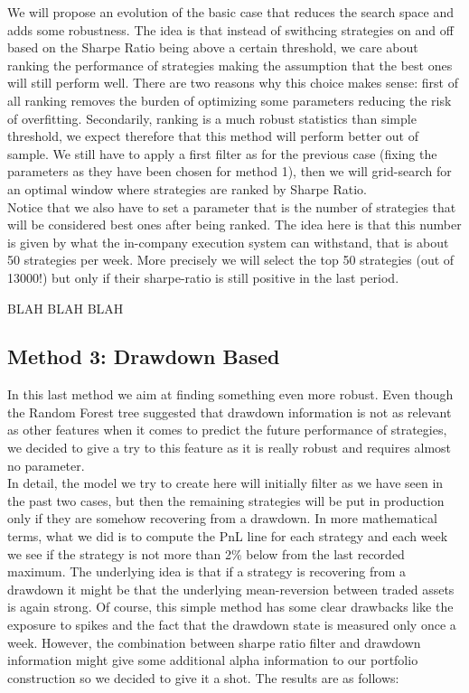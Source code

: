 \documentclass[a4paper]{article}
\numberwithin{equation}{subsection}
\begin{document}
We will propose an evolution of the basic case that reduces the search space and adds some robustness. The idea is that instead of swithcing strategies on and off based on the Sharpe Ratio being above a certain threshold, we care about ranking the performance of strategies making the assumption that the best ones will still perform well. There are two reasons why this choice makes sense: first of all ranking removes the burden of optimizing some parameters reducing the risk of overfitting. Secondarily, ranking is a much robust statistics than simple threshold, we expect therefore that this method will perform better out of sample. We still have to apply a first filter as for the previous case (fixing the parameters as they have been chosen for method 1), then we will grid-search for an optimal window where strategies are ranked by Sharpe Ratio.\\
Notice that we also have to set a parameter that is the number of strategies that will be considered best ones after being ranked. The idea here is that this number is given by what the in-company execution system can withstand, that is about 50 strategies per week. More precisely we will select the top 50 strategies (out of 13000!) but only if their sharpe-ratio is still positive in the last period.


BLAH BLAH BLAH\\


\subsection*{Method 3: Drawdown Based}

In this last method we aim at finding something even more robust. Even though the Random Forest tree suggested that drawdown information is not as relevant as other features when it comes to predict the future performance of strategies, we decided to give a try to this feature as it is really robust and requires almost no parameter.\\
In detail, the model we try to create here will initially filter as we have seen in the past two cases, but then the remaining strategies will be put in production only if they are somehow recovering from a drawdown. In more mathematical terms, what we did is to compute the PnL line for each strategy and each week we see if the strategy is not more than 2\% below from the last recorded maximum. The underlying idea is that if a strategy is recovering from a drawdown it might be that the underlying mean-reversion between traded assets is again strong. Of course, this simple method has some clear drawbacks like the exposure to spikes and the fact that the drawdown state is measured only once a week. However, the combination between sharpe ratio filter and drawdown information might give some additional alpha information to our portfolio construction so we decided to give it a shot. The results are as follows: 
\end{document}
